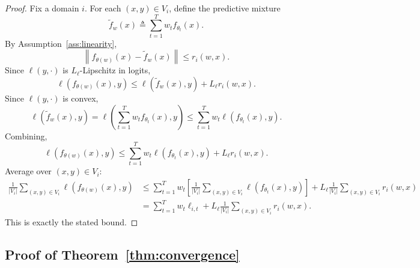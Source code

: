 \documentclass{article}
\newcommand{\norm}[1]{\left\lVert #1 \right\rVert}
\begin{document}
\begin{proof}
Fix a domain \(i\). For each \((x,y)\in V_i\), define the predictive mixture
\begin{equation}
    \tilde f_w(x) \triangleq \sum_{t=1}^{T} w_t f_{\theta_t}(x).
\end{equation}
By Assumption~\ref{ass:linearity},
\begin{equation}
    \norm{f_{\theta(w)}(x)-\tilde f_w(x)} \le r_i(w,x).
\end{equation}
Since \(\ell(y,\cdot)\) is \(L_\ell\)-Lipschitz in logits,
\begin{equation}
    \ell(f_{\theta(w)}(x),y)
    \le
    \ell(\tilde f_w(x),y)
    +
    L_\ell r_i(w,x).
\end{equation}
Since \(\ell(y,\cdot)\) is convex,
\begin{equation}
    \ell(\tilde f_w(x),y)
    =
    \ell\!\left(\sum_{t=1}^{T} w_t f_{\theta_t}(x),y\right)
    \le
    \sum_{t=1}^{T} w_t \ell(f_{\theta_t}(x),y).
\end{equation}
Combining,
\begin{equation}
    \ell(f_{\theta(w)}(x),y)
    \le
    \sum_{t=1}^{T} w_t \ell(f_{\theta_t}(x),y)
    +
    L_\ell r_i(w,x).
\end{equation}
Average over \((x,y)\in V_i\):
\begin{align}
    \frac{1}{|V_i|}\sum_{(x,y)\in V_i}\ell(f_{\theta(w)}(x),y)
    &\le
    \sum_{t=1}^{T} w_t \left[\frac{1}{|V_i|}\sum_{(x,y)\in V_i}\ell(f_{\theta_t}(x),y)\right]
    +
    L_\ell \frac{1}{|V_i|}\sum_{(x,y)\in V_i} r_i(w,x) \\
    &=
    \sum_{t=1}^{T} w_t \ell_{i,t}
    +
    L_\ell \frac{1}{|V_i|}\sum_{(x,y)\in V_i} r_i(w,x).
\end{align}
This is exactly the stated bound. \qedhere
\end{proof}

\subsection{Proof of Theorem~\ref{thm:convergence}}
\end{document}
